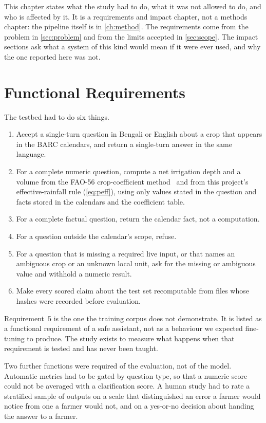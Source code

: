This chapter states what the study had to do, what it was not allowed to do, and who is affected by it. It is a requirements and impact chapter, not a methods chapter: the pipeline itself is in \cref{ch:method}. The requirements come from the problem in \cref{sec:problem} and from the limits accepted in \cref{sec:scope}. The impact sections ask what a system of this kind would mean if it were ever used, and why the one reported here was not.

\section{Functional Requirements}
\label{sec:func-req}

The testbed had to do six things.

\begin{enumerate}[leftmargin=*]
  \item Accept a single-turn question in Bengali or English about a crop that appears in the BARC calendars, and return a single-turn answer in the same language.
  \item For a complete numeric question, compute a net irrigation depth and a volume from the FAO-56 crop-coefficient method~\cite{allen1998fao56} and from this project's effective-rainfall rule (\cref{eq:peff}), using only values stated in the question and facts stored in the calendars and the coefficient table.
  \item For a complete factual question, return the calendar fact, not a computation.
  \item For a question outside the calendar's scope, refuse.
  \item For a question that is missing a required live input, or that names an ambiguous crop or an unknown local unit, ask for the missing or ambiguous value and withhold a numeric result.
  \item Make every scored claim about the test set recomputable from files whose hashes were recorded before evaluation.
\end{enumerate}

Requirement~5 is the one the training corpus does not demonstrate. It is listed as a functional requirement of a safe assistant, not as a behaviour we expected fine-tuning to produce. The study exists to measure what happens when that requirement is tested and has never been taught.

Two further functions were required of the evaluation, not of the model. Automatic metrics had to be gated by question type, so that a numeric score could not be averaged with a clarification score. A human study had to rate a stratified sample of outputs on a scale that distinguished an error a farmer would notice from one a farmer would not, and on a yes-or-no decision about handing the answer to a farmer.

